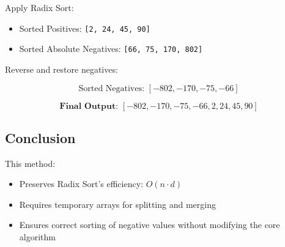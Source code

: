 \documentclass[14pt]{extarticle}
\begin{document}
Apply Radix Sort:

\begin{itemize}
    \item Sorted Positives: \texttt{[2, 24, 45, 90]}
    \item Sorted Absolute Negatives: \texttt{[66, 75, 170, 802]}
\end{itemize}

Reverse and restore negatives:

\[
\text{Sorted Negatives: } [-802, -170, -75, -66]
\]

\[
\textbf{Final Output: } [-802, -170, -75, -66, 2, 24, 45, 90]
\]

\subsection*{Conclusion}

This method:
\begin{itemize}
    \item Preserves Radix Sort’s efficiency: $O(n \cdot d)$
    \item Requires temporary arrays for splitting and merging
    \item Ensures correct sorting of negative values without modifying the core algorithm
\end{itemize}
\end{document}
